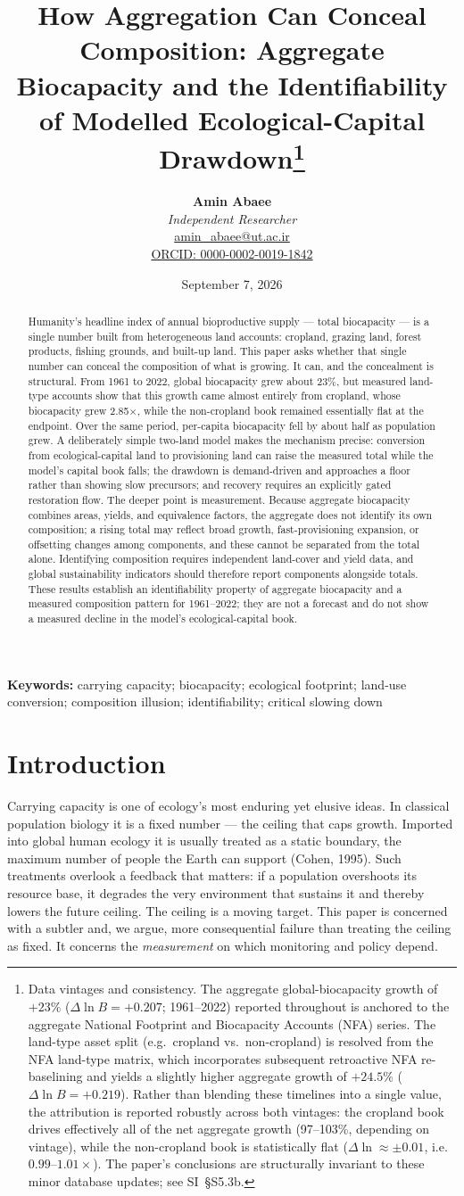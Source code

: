 \documentclass[11pt]{article}
\title{How Aggregation Can Conceal Composition: Aggregate Biocapacity and the Identifiability of Modelled Ecological-Capital Drawdown\thanks{Data vintages and consistency. The aggregate global-biocapacity growth of $+23\%$ ($\Delta\ln B=+0.207$; 1961--2022) reported throughout is anchored to the aggregate National Footprint and Biocapacity Accounts (NFA) series. The land-type asset split (e.g.\ cropland vs.\ non-cropland) is resolved from the NFA land-type matrix, which incorporates subsequent retroactive NFA re-baselining and yields a slightly higher aggregate growth of $+24.5\%$ ($\Delta\ln B=+0.219$). Rather than blending these timelines into a single value, the attribution is reported robustly across both vintages: the cropland book drives effectively all of the net aggregate growth (\raisebox{0pt}{$\approx$}97--103\%, depending on vintage), while the non-cropland book is statistically flat ($\Delta\ln\approx\pm0.01$, i.e.\ $0.99$--$1.01\times$). The paper's conclusions are structurally invariant to these minor database updates; see SI~§S5.3b.}}
\author{
  \textbf{Amin Abaee}\\
  \textit{Independent Researcher}\\
  \href{mailto:amin_abaee@ut.ac.ir}{amin\_abaee@ut.ac.ir}\\
  \href{https://orcid.org/0000-0002-0019-1842}{ORCID: 0000-0002-0019-1842}
}
\date{September 7, 2026}
\begin{document}
\maketitle

\begin{abstract}
Humanity's headline index of annual bioproductive supply --- total biocapacity --- is a single number built from heterogeneous land accounts: cropland, grazing land, forest products, fishing grounds, and built-up land. This paper asks whether that single number can conceal the composition of what is growing. It can, and the concealment is structural. From 1961 to 2022, global biocapacity grew about 23\%, but measured land-type accounts show that this growth came almost entirely from cropland, whose biocapacity grew 2.85$\times$, while the non-cropland book remained essentially flat at the endpoint. Over the same period, per-capita biocapacity fell by about half as population grew. A deliberately simple two-land model makes the mechanism precise: conversion from ecological-capital land to provisioning land can raise the measured total while the model's capital book falls; the drawdown is demand-driven and approaches a floor rather than showing slow precursors; and recovery requires an explicitly gated restoration flow. The deeper point is measurement. Because aggregate biocapacity combines areas, yields, and equivalence factors, the aggregate does not identify its own composition; a rising total may reflect broad growth, fast-provisioning expansion, or offsetting changes among components, and these cannot be separated from the total alone. Identifying composition requires independent land-cover and yield data, and global sustainability indicators should therefore report components alongside totals. These results establish an identifiability property of aggregate biocapacity and a measured composition pattern for 1961--2022; they are not a forecast and do not show a measured decline in the model's ecological-capital book.
\end{abstract}

\medskip
\noindent\textbf{Keywords:} carrying capacity; biocapacity; ecological footprint; land-use conversion; composition illusion; identifiability; critical slowing down

\section{Introduction}

Carrying capacity is one of ecology's most enduring yet elusive ideas. In classical population biology it is a fixed number --- the ceiling that caps growth. Imported into global human ecology it is usually treated as a static boundary, the maximum number of people the Earth can support (Cohen, 1995). Such treatments overlook a feedback that matters: if a population overshoots its resource base, it degrades the very environment that sustains it and thereby lowers the future ceiling. The ceiling is a moving target. This paper is concerned with a subtler and, we argue, more consequential failure than treating the ceiling as fixed. It concerns the \emph{measurement} on which monitoring and policy depend.
\end{document}
